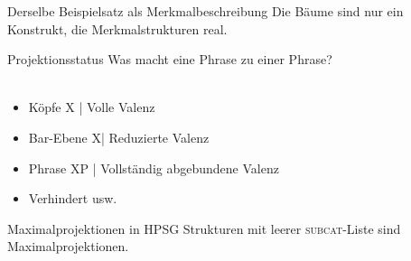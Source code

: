 \begin{frame}
  {Derselbe Beispielsatz als Merkmalbeschreibung}
  \onslide<+->
  \onslide<+->
  Die Bäume sind nur ein Konstrukt, die Merkmalstrukturen real.\\
  \onslide<+->
  \Halbzeile
  \centering 
\end{frame}

\begin{frame}
  {Projektionsstatus}
  \onslide<+->
  \onslide<+->
  Was macht eine \alert{Phrase zu einer Phrase}?\\
  \\
  \Zeile
  \begin{itemize}[<+->]
    \item Köpfe X | \alert{Volle Valenz}
    \item Bar-Ebene X\Prm | \alert{Reduzierte Valenz}
    \item Phrase XP | \alert{Vollständig abgebundene Valenz}
      \Halbzeile
    \item Verhindert  usw.
  \end{itemize}
  \onslide<+->
  \Zeile
  \begin{block}
    {Maximalprojektionen in HPSG}
    Strukturen mit leerer \textsc{subcat}-Liste sind Maximalprojektionen.
  \end{block}
\end{frame}

